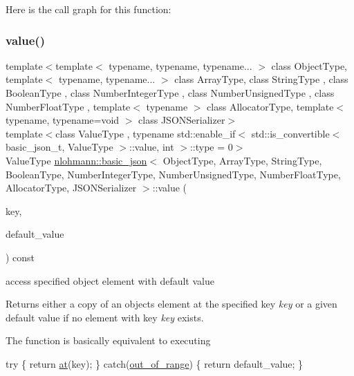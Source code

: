 Here is the call graph for this function\+:
\mbox{\label{classnlohmann_1_1basic__json_adcf8ca5079f5db993820bf50036bf45d}} 
\subsubsection{\texorpdfstring{value()}{value()}\hspace{0.1cm}{\footnotesize\ttfamily [1/4]}}
{\footnotesize\ttfamily template$<$template$<$ typename, typename, typename... $>$ class Object\+Type, template$<$ typename, typename... $>$ class Array\+Type, class String\+Type , class Boolean\+Type , class Number\+Integer\+Type , class Number\+Unsigned\+Type , class Number\+Float\+Type , template$<$ typename $>$ class Allocator\+Type, template$<$ typename, typename=void $>$ class J\+S\+O\+N\+Serializer$>$ \\
template$<$class Value\+Type , typename std\+::enable\+\_\+if$<$ std\+::is\+\_\+convertible$<$ basic\+\_\+json\+\_\+t, Value\+Type $>$\+::value, int $>$\+::type  = 0$>$ \\
Value\+Type \hyperlink{classnlohmann_1_1basic__json}{nlohmann\+::basic\+\_\+json}$<$ Object\+Type, Array\+Type, String\+Type, Boolean\+Type, Number\+Integer\+Type, Number\+Unsigned\+Type, Number\+Float\+Type, Allocator\+Type, J\+S\+O\+N\+Serializer $>$\+::value (\begin{DoxyParamCaption}\item[{const typename object\+\_\+t\+::key\+\_\+type \&}]{key,  }\item[{const Value\+Type \&}]{default\+\_\+value }\end{DoxyParamCaption}) const\hspace{0.3cm}{\ttfamily [inline]}}



access specified object element with default value 

Returns either a copy of an object\textquotesingle{}s element at the specified key {\itshape key} or a given default value if no element with key {\itshape key} exists.

The function is basically equivalent to executing 
\begin{DoxyCode}
\textcolor{keywordflow}{try} \{
    \textcolor{keywordflow}{return} \hyperlink{classnlohmann_1_1basic__json_a73ae333487310e3302135189ce8ff5d8}{at}(key);
\} \textcolor{keywordflow}{catch}(\hyperlink{classnlohmann_1_1basic__json_a28f7c2f087274a0012eb7a2333ee1580}{out\_of\_range}) \{
    \textcolor{keywordflow}{return} default\_value;
\}
\end{DoxyCode}


